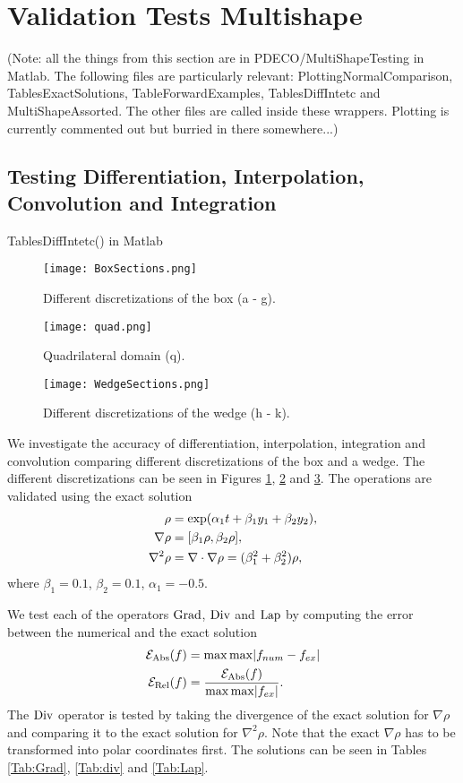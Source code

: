 
\section{Validation Tests Multishape}
(Note: all the things from this section are in PDECO/MultiShapeTesting in Matlab. The following files are particularly relevant:
PlottingNormalComparison, TablesExactSolutions, TableForwardExamples, TablesDiffIntetc and MultiShapeAssorted. The other files are called inside these wrappers. Plotting is currently commented out but burried in there somewhere...)

\subsection{Testing Differentiation, Interpolation, Convolution and Integration} \label{sec:ValidationDiffIntetc}
TablesDiffIntetc() in Matlab
	\begin{figure}[h]
	\centering
	\texttt{[image: BoxSections.png]}
	\caption{Different discretizations of the box (a - g).} 
	\label{F2}
\end{figure}
\begin{figure}[h]
	\centering
	\texttt{[image: quad.png]}
	\caption{Quadrilateral domain (q).} 
	\label{F3a}
\end{figure}
\begin{figure}[h]
	\centering
	\texttt{[image: WedgeSections.png]}
	\caption{Different discretizations of the wedge (h - k).} 
	\label{F4}
\end{figure}


We investigate the accuracy of differentiation, interpolation, integration and convolution comparing different discretizations of the box and a wedge. The different discretizations can be seen in Figures \ref{F2}, \ref{F3a} and \ref{F4}.
The operations are validated using the exact solution
\begin{align}\label{eq:exactsol1}
	\rho &= \exp( \alpha_1  t + \beta_1 y_1 + \beta_2 y_2),\\
	\nabla \rho &= [\beta_1 \rho, \beta_2 \rho],\notag \\
	\nabla^2 \rho &= \nabla \cdot \nabla \rho = (\beta_1^2 + \beta_2^2)\rho,\notag
\end{align}
where $	\beta_1 = 0.1 $, $\beta_2 = 0.1$, $\alpha_1 = -0.5$.


We test each of the operators $\operatorname{Grad}$, $\operatorname{Div}$ and $\operatorname{Lap}$ by computing the error between the numerical and the exact solution
\begin{align}\label{eq:ErrorMeasure1}
	\mathcal E_{\text{Abs}} (f)&= \max \max \abs{f_{num} - f_{ex}}\\
	\mathcal E_{\text{Rel}} (f)&= \frac{\mathcal E_{\text{Abs}}(f) }{ \max \max \abs{f_{ex}}}.
\end{align}
The $\operatorname{Div}$ operator is tested by taking the divergence of the exact solution for $\nabla \rho$ and comparing it to the exact solution for $\nabla^2 \rho$. Note that the exact $\nabla \rho$ has to be transformed into polar coordinates first. The solutions can be seen in Tables \ref{Tab:Grad}, \ref{Tab:div} and \ref{Tab:Lap}.

